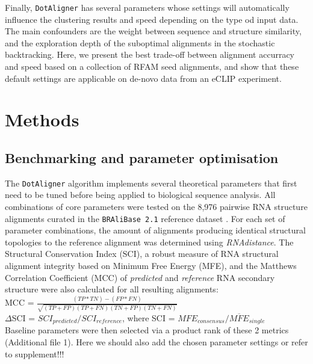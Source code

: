 \documentclass{bmcart}
\newcommand\dotaligner{\texttt{DotAligner}}
\newcommand\bralibase{\texttt{BRAliBase 2.1}}
\begin{document}
Finally, \dotaligner{} has several parameters whose settings will automatically
influence the clustering results and speed depending on the type od input data.
The main confounders are the weight between sequence and structure similarity,
and the exploration depth of the suboptimal alignments in the stochastic
backtracking. Here, we present the best trade-off between alignment
accurracy and speed based on a collection of RFAM seed alignments, and show that these default settings are applicable on de-novo data from an eCLIP experiment. 



\section*{Methods}
\subsection*{Benchmarking and parameter optimisation}

The \dotaligner{} algorithm implements several theoretical parameters that
first need to be tuned before being applied to biological sequence
analysis. All combinations of core parameters were tested on the 8,976
pairwise RNA structure alignments curated in the \bralibase{} reference dataset
\cite{wilm2006enhanced}. For each set of parameter combinations, the amount of
alignments producing identical structural topologies to the reference alignment
was determined using \textit{RNAdistance}. The Structural Conservation Index
(SCI), a robust measure of RNA structural alignment integrity
\cite{gruber2008strategies} based on Minimum Free Energy (MFE), and the Matthews Correlation Coefficient (MCC) of \textit{predicted} and \textit{reference} RNA secondary structure
were also calculated for all resulting alignments: \\

MCC = $\frac{(TP * TN) - (FP * FN)}{ \sqrt{ (TP + FP)(TP + FN)(TN + FP)(TN + FN) }}$\\

$\Delta$SCI = $SCI_{predicted} / SCI_{reference}$, where SCI = $ MFE_{consensus}  / \overline{MFE}_{single}  $\\

Baseline parameters were then selected via a product rank of these 2 metrics
{\color{red} (Additional file 1). Here we should also add the chosen parameter settings or refer to supplement!!!}
\end{document}

